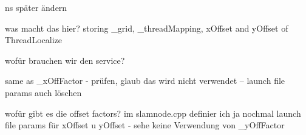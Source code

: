 
\begin{DoxyRefList}
\item[\label{todo__todo000007}%
\hypertarget{todo__todo000007}{}%
Namespace \hyperlink{namespaceohm__tsd__slam__ref}{ohm\-\_\-tsd\-\_\-slam\-\_\-ref} ]ns später ändern  
\item[\label{todo__todo000013}%
\hypertarget{todo__todo000013}{}%
Member \hyperlink{classohm__tsd__slam__ref_1_1SlamNode_abe1e2022599a8ce220de76b142486ea8}{ohm\-\_\-tsd\-\_\-slam\-\_\-ref\-:\-:Slam\-Node\-:\-:\-\_\-localizers} ]was macht das hier? storing \-\_\-grid, \-\_\-thread\-Mapping, x\-Offset and y\-Offset of Thread\-Localize  
\item[\label{todo__todo000014}%
\hypertarget{todo__todo000014}{}%
Member \hyperlink{classohm__tsd__slam__ref_1_1SlamNode_a2941b11fc25f02fad3467297f0260fec}{ohm\-\_\-tsd\-\_\-slam\-\_\-ref\-:\-:Slam\-Node\-:\-:\-\_\-service\-Start\-Stop\-S\-L\-A\-M} ]wofür brauchen wir den service?  
\item[\label{todo__todo000011}%
\hypertarget{todo__todo000011}{}%
Member \hyperlink{classohm__tsd__slam__ref_1_1SlamNode_ad57ec9810293549dc803209a950a776f}{ohm\-\_\-tsd\-\_\-slam\-\_\-ref\-:\-:Slam\-Node\-:\-:\-\_\-x\-Off\-Factor} ]same as \-\_\-x\-Off\-Factor -\/ prüfen, glaub das wird nicht verwendet -- launch file params auch löschen  
\item[\label{todo__todo000012}%
\hypertarget{todo__todo000012}{}%
Member \hyperlink{classohm__tsd__slam__ref_1_1SlamNode_a591fdd2fc92e9fd53112b36f0125cf51}{ohm\-\_\-tsd\-\_\-slam\-\_\-ref\-:\-:Slam\-Node\-:\-:\-\_\-y\-Off\-Factor} ]wofür gibt es die offset factors? im slamnode.\-cpp definier ich ja nochmal launch file params für x\-Offset u y\-Offset -\/ sehe keine Verwendung von \-\_\-y\-Off\-Factor 


\end{DoxyRefList}
